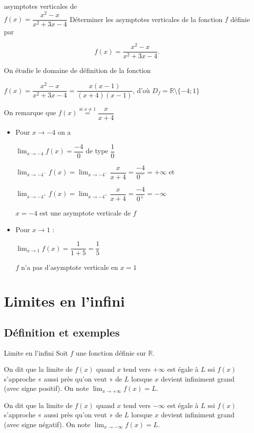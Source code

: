 \documentclass[a4paper,12pt]{article}
\begin{document}
\begin{exemple}[label=ex:asver]
asymptotes verticales de \\
\medskip
$f(x) = \dfrac{x^2 - x}{x^2 + 3x - 4}$
\tcblower
Déterminer les asymptotes verticales de la fonction $f$ définie par 

\[f(x) = \dfrac{x^2 - x}{x^2 + 3x - 4}.\]

On étudie le domaine de définition de la fonction 

$f(x) = \dfrac{x^2 - x}{x^2 + 3x - 4} = \dfrac{x(x - 1)}{(x + 4)(x - 1)}$, d'où $D_f = \mathbb{R} \setminus \{-4; 1\}$

On remarque que $f(x) \stackrel{\text{si }x\neq 1}{=}\dfrac{x}{x + 4}$
\begin{itemize}
	\item Pour $x\rightarrow -4$ on a 

		$\displaystyle\lim_{x \to -4} f(x) = \dfrac{-4}{0}$ de type $\dfrac{1}{0}$

$\displaystyle\lim_{x \to -4^-} f(x) = \lim_{x \to -4^-} \dfrac{x}{x + 4} = \dfrac{-4}{0^-} = +\infty$ et

$\displaystyle\lim_{x \to -4^+} f(x) = \lim_{x \to -4^+} \dfrac{x}{x + 4} = \dfrac{-4}{0^+} = -\infty$

$x = -4$ est une asymptote verticale de $f$
\item Pour $x \to 1$ :

$\displaystyle\lim_{x \to 1} f(x) = \dfrac{1}{1 + 5} = \dfrac{1}{5}$

$f$ n'a pas d'asymptote verticale en $x = 1$
\end{itemize}
\end{exemple}


\section{Limites en l'infini}
\subsection{Définition et exemples}
\begin{definition}
Limite en l'infini	
\tcblower
Soit \(f\) une fonction définie sur \(\mathbb{R}\).

On dit que la limite de \(f(x)\) quand \(x\) tend vers $+\infty$ est égale à \(L\) ssi \(f(x)\) s'approche « aussi près qu'on veut » de \(L\) lorsque \(x\) devient infiniment grand (avec signe positif). On note $\lim_{x\to+\infty}f(x)=L$.

On dit que la limite de \(f(x)\) quand \(x\) tend vers $-\infty$ est égale à \(L\) ssi \(f(x)\) s'approche « aussi près qu'on veut » de \(L\) lorsque \(x\) devient infiniment grand (avec signe négatif). On note $\lim_{x\to-\infty}f(x)=L$.
\end{definition}
\end{document}
